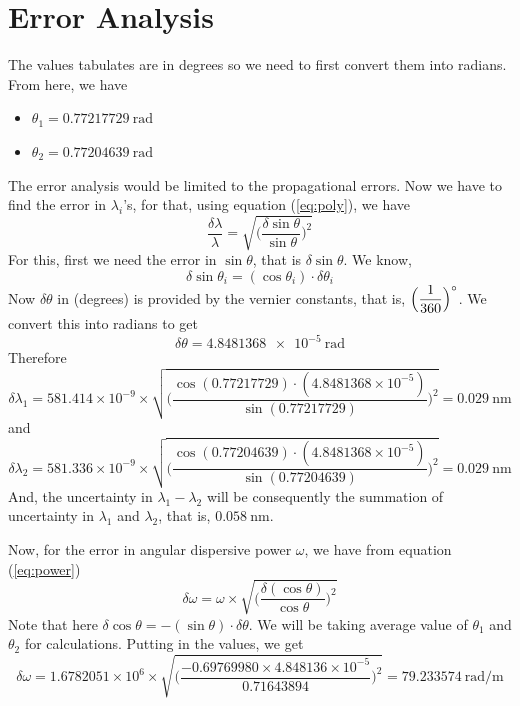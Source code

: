 \documentclass{article}
\begin{document}
\section{Error Analysis}
The values tabulates are in degrees so we need to first convert them into radians. From here, we have
\begin{itemize}
    \item $\theta_1 = \SI{0.77217729}{\radian}$
    \item $\theta_2 = \SI{0.77204639}{\radian}$
\end{itemize}
The error analysis would be limited to the propagational errors. Now we have to find the error in $\lambda_i$'s, for that, using equation (\ref{eq:poly}), we have
\begin{equation}
    \dfrac{\delta \lambda}{\lambda} = \sqrt{\Big( \dfrac{\delta \sin \theta}{\sin \theta} \Big)^2}
\end{equation}
For this, first we need the error in $\sin \theta$, that is $\delta \sin \theta$. We know, 
\begin{equation}
    \delta \sin \theta_i = (\cos \theta_i) \cdot \delta \theta_i
\end{equation}
Now $\delta \theta$ in (degrees) is provided by the vernier constants, that is, $\Big( \dfrac{1}{360} \Big) \degree$. We convert this into radians to get
\begin{equation}
    \delta \theta = \SI{4.8481368e-5}{\radian}
\end{equation}
Therefore
\begin{equation}
    \delta \lambda_1 = 581.414 \times 10^{-9} \times \sqrt{\Big( \dfrac{\cos (0.77217729) \cdot (4.8481368 \times 10^{-5})}{\sin (0.77217729)} \Big)^2} = \SI{0.029}{\nano \metre}
\end{equation}
and
\begin{equation}
    \delta \lambda_2 = 581.336 \times 10^{-9} \times \sqrt{\Big( \dfrac{\cos (0.77204639) \cdot (4.8481368 \times 10^{-5})}{\sin (0.77204639)} \Big)^2} = \SI{0.029}{\nano \metre}
\end{equation}
And, the uncertainty in $\lambda_1 - \lambda_2$ will be consequently the summation of uncertainty in $\lambda_1$ and $\lambda_2$, that is, $\SI{0.058}{\nano \metre}$.
\par
\noindent
Now, for the error in angular dispersive power $\omega$, we have from equation (\ref{eq:power})
\begin{equation}
    \delta \omega = \omega \times \sqrt{\Big( \dfrac{\delta (\cos \theta)}{\cos \theta} \Big)^2}
\end{equation}
Note that here $\delta \cos \theta = -(\sin \theta) \cdot \delta \theta$. We will be taking average value of $\theta_1$ and $\theta_2$ for calculations. Putting in the values, we get
\begin{equation}
    \delta \omega = 1.6782051 \times 10^6 \times \sqrt{\Big( \dfrac{-0.69769980 \times 4.848136 \times 10^{-5}}{0.71643894} \Big)^2} = \SI{79.233574}{\radian \per \metre}
\end{equation}
\end{document}
